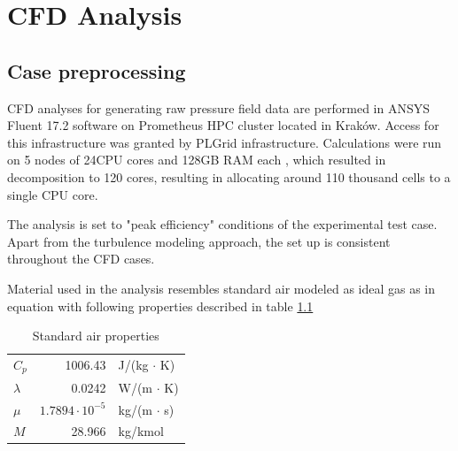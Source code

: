 
\chapter{CFD Analysis} %

\label{cfd} %


\section{Case preprocessing} \label{casepre}

CFD analyses for generating raw pressure field data are performed in ANSYS Fluent 17.2 software on Prometheus HPC cluster located in Kraków. Access for this infrastructure was granted by PLGrid infrastructure. Calculations were run on 5 nodes of 24CPU cores and 128GB RAM each \citep{prometheus}, which resulted in decomposition to 120 cores, resulting in allocating around 110 thousand cells to a single CPU core.

The analysis is set to "peak efficiency" conditions of the experimental test case. Apart from the turbulence modeling approach, the set up is consistent throughout the CFD cases.

Material used in the analysis resembles standard air modeled as ideal gas as in equation with following properties described in table \ref{tab:stdair} 

\begin{table}[ht!]
\centering
\caption{Standard air properties} \label{tab:stdair}
\begin{tabular}{@{}lrl@{}}
\toprule
$C_p$ & 1006.43 & J/(kg $\cdot$ K) \\
$\lambda$ & 0.0242 & W/(m $\cdot$ K) \\
$\mu$ & $1.7894 \cdot 10^{-5}$ & kg/(m $\cdot$ s) \\
$M$ & 28.966 & kg/kmol \\
\bottomrule
\end{tabular}
\end{table}

